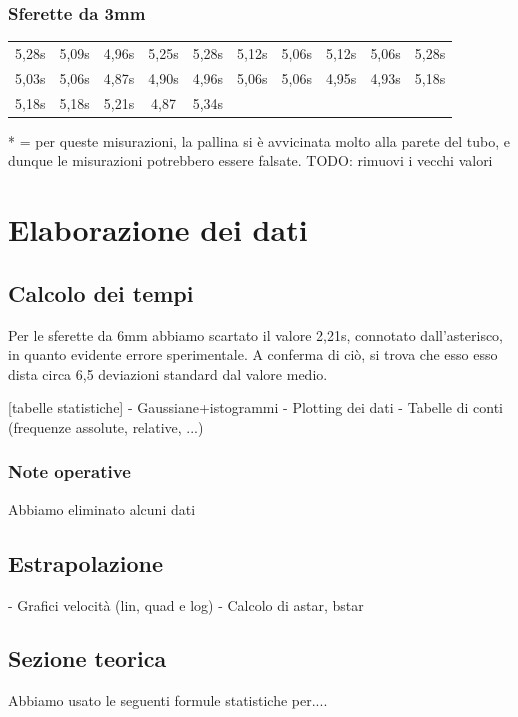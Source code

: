 \documentclass[a4paper,10pt]{report}
\begin{document}
\subsubsection{Sferette da 3mm}

\begin{tabular}{|c|c|c|c|c|c|c|c|c|c|}
\toprule
 5,28s & 5,09s & 4,96s & 5,25s & 5,28s & 5,12s & 5,06s & 5,12s & 5,06s & 5,28s \\
 5,03s & 5,06s & 4,87s & 4,90s & 4,96s & 5,06s & 5,06s & 4,95s & 4,93s & 5,18s \\
 5,18s & 5,18s & 5,21s & 4,87 & 5,34s &  &  &  &  & \\
\bottomrule
\end{tabular}

* = per queste misurazioni, la pallina si è avvicinata molto alla parete del tubo, e dunque le misurazioni potrebbero essere falsate.
TODO: rimuovi i vecchi valori

\section{Elaborazione dei dati}
\subsection{Calcolo dei tempi}
Per le sferette da 6mm abbiamo scartato il valore 2,21s, connotato dall'asterisco, in quanto evidente errore sperimentale. A conferma di ciò, si trova che esso esso dista circa 6,5 deviazioni standard dal valore medio.

[tabelle statistiche]
- Gaussiane+istogrammi
- Plotting dei dati
- Tabelle di conti (frequenze assolute, relative, ...)

\subsubsection{Note operative}
Abbiamo eliminato alcuni dati

\subsection{Estrapolazione}
- Grafici velocità (lin, quad e log)
- Calcolo di astar, bstar

\subsection{Sezione teorica}
Abbiamo usato le seguenti formule statistiche per....
\end{document}
